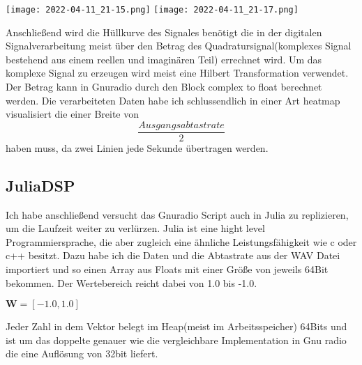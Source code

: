 \begin{multicols*}{2}
    \begin{center}
        \centering
        \texttt{[image: 2022-04-11\_21-15.png]}
        \texttt{[image: 2022-04-11\_21-17.png]}
    \end{center} 

    Anschließend wird die Hüllkurve des Signales benötigt die in der digitalen Signalverarbeitung meist über den Betrag des Quadratursignal(komplexes Signal bestehend aus einem reellen und imaginären Teil) errechnet wird. Um das komplexe Signal zu erzeugen wird meist eine Hilbert Transformation verwendet. Der Betrag kann in Gnuradio durch den Block complex to float berechnet werden. 
    Die verarbeiteten Daten habe ich schlussendlich in einer Art heatmap visualisiert die einer Breite von $$\frac{Ausgangsabtastrate}{2} $$ haben muss, da zwei Linien jede Sekunde übertragen werden.
    \subsection*{JuliaDSP}
    Ich habe anschließend versucht das Gnuradio Script auch in Julia zu replizieren, um die Laufzeit weiter zu verlürzen. Julia ist eine hight level Programmiersprache, die aber zugleich eine ähnliche Leistungsfähigkeit wie c oder c++ besitzt.
    Dazu habe ich die Daten und die Abtastrate aus der WAV Datei importiert und so einen Array aus Floats mit einer Größe von jeweils 64Bit bekommen. Der Wertebereich reicht dabei von 1.0 bis -1.0.
   
    \begin{math}
        \mathbf{W} =[-1.0, 1.0]
    \end{math}

    Jeder Zahl in dem Vektor belegt im Heap(meist im Arbeitsspeicher) 64Bits und ist um das doppelte genauer wie die vergleichbare Implementation in Gnu radio die eine Auflösung von 32bit liefert. 


\end{multicols*}
